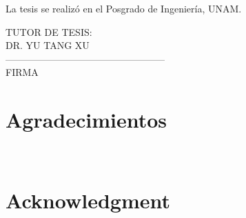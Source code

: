\documentclass[11pt,letterpaper,twoside,openright]{report}
\begin{document}
\begin{tabbing}
\end{tabbing}

\vspace{1.5cm}
\noindent La tesis se realizó en el Posgrado de Ingeniería, UNAM.\\

\begin{center}
	TUTOR  DE  TESIS:\\\vspace{.04cm}
	DR. YU TANG XU\\
	\vspace{2cm}
	--------------------------------------------------\\
	FIRMA
\end{center}

\newpage
\thispagestyle{empty}
%    


\newpage
%
\chapter*{Agradecimientos} 
\thispagestyle{empty}
\begin{flushright}

\end{flushright}
\newpage
\thispagestyle{empty}
$\ $   
    
    
\newpage
%
\chapter*{Acknowledgment} 
\thispagestyle{empty}
\begin{flushright}
	
\end{flushright}
\newpage
\thispagestyle{empty}
$\ $





\end{document}

